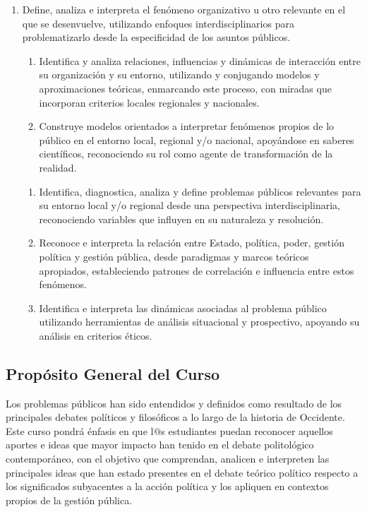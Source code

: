 \documentclass[letterpaper]{article}
\begin{document}
\begin{enumerate}
  \item[] Define, analiza e interpreta el fen\'omeno organizativo u otro relevante en el que se desenvuelve, utilizando enfoques interdisciplinarios para problematizarlo desde la especificidad de los asuntos p\'ublicos.
     \begin{enumerate} 
      \item Identifica y analiza relaciones, influencias y din\'amicas de interacci\'on entre su organizaci\'on y su entorno, utilizando y conjugando modelos y aproximaciones te\'oricas, enmarcando este proceso, con miradas que incorporan criterios locales regionales y nacionales. 
      \item Construye modelos orientados a interpretar fen\'omenos propios de lo p\'ublico en el entorno local, regional y/o nacional, apoy\'andose en saberes cient\'ificos, reconociendo su rol como agente de transformaci\'on de la realidad.
    \end{enumerate}
  
  \begin{enumerate}
    \item Identifica, diagnostica, analiza y define problemas p\'ublicos relevantes para su entorno local y/o regional desde una perspectiva interdisciplinaria, reconociendo variables que influyen en su naturaleza y resoluci\'on. 
    \item Reconoce e interpreta la relaci\'on entre Estado, pol\'itica, poder, gesti\'on pol\'itica y gesti\'on p\'ublica, desde paradigmas y marcos te\'oricos apropiados, estableciendo patrones de correlaci\'on e influencia entre estos fen\'omenos.
    \item Identifica e interpreta las din\'amicas asociadas al problema p\'ublico utilizando herramientas de an\'alisis situacional y prospectivo, apoyando su an\'alisis en criterios \'eticos. 
  \end{enumerate}

\end{enumerate}


\subsection*{Prop\'osito General del Curso}

Los problemas p\'ublicos han sido entendidos y definidos como resultado de los principales debates pol\'iticos y filos\'oficos a lo largo de la historia de Occidente. Este curso pondr\'a \'enfasis en que l$@$s estudiantes puedan reconocer aquellos aportes e ideas que mayor impacto han tenido en el debate politol\'ogico contempor\'aneo, con el objetivo que comprendan, analicen e interpreten las principales ideas que han estado presentes en el debate te\'orico pol\'itico respecto a los significados subyacentes a la acci\'on pol\'itica y los apliquen en contextos propios de la gesti\'on p\'ublica.
\end{document}
